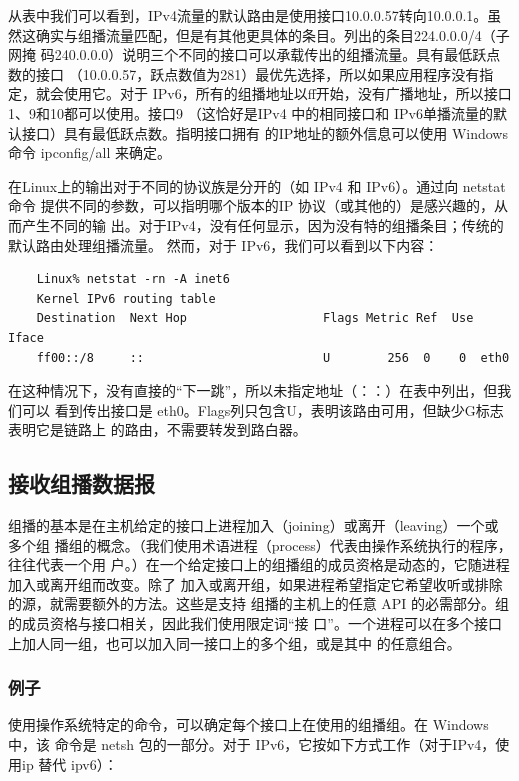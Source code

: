 从表中我们可以看到，IPv4流量的默认路由是使用接口10.0.0.57转向10.0.0.1。虽
然这确实与组播流量匹配，但是有其他更具体的条目。列出的条目224.0.0.0/4（子网掩
码240.0.0.0）说明三个不同的接口可以承载传出的组播流量。具有最低跃点数的接口
（10.0.0.57，跃点数值为281）最优先选择，所以如果应用程序没有指定，就会使用它。对于
IPv6，所有的组播地址以ff开始，没有广播地址，所以接口1、9和10都可以使用。接口9
（这恰好是IPv4 中的相同接口和 IPv6单播流量的默认接口）具有最低跃点数。指明接口拥有
的IP地址的额外信息可以使用 Windows 命令 ipconfig/all 来确定。

在Linux上的输出对于不同的协议族是分开的（如 IPv4 和 IPv6）。通过向 netstat 命令
提供不同的参数，可以指明哪个版本的IP 协议（或其他的）是感兴趣的，从而产生不同的输
出。对于IPv4，没有任何显示，因为没有特的组播条目；传统的默认路由处理组播流量。
然而，对于 IPv6，我们可以看到以下内容：

\begin{verbatim}
    Linux% netstat -rn -A inet6
    Kernel IPv6 routing table
    Destination  Next Hop                   Flags Metric Ref  Use Iface
    ff00::/8     ::                         U        256  0    0  eth0
\end{verbatim}

在这种情况下，没有直接的“下一跳”，所以未指定地址（：：）在表中列出，但我们可以
看到传出接口是 eth0。Flags列只包含U，表明该路由可用，但缺少G标志表明它是链路上
的路由，不需要转发到路白器。

\subsection{接收组播数据报}
组播的基本是在主机给定的接口上进程加入（joining）或离开（leaving）一个或多个组
播组的概念。（我们使用术语进程（process）代表由操作系统执行的程序，往往代表一个用
户。）在一个给定接口上的组播组的成员资格是动态的，它随进程加入或离开组而改变。除了
加入或离开组，如果进程希望指定它希望收听或排除的源，就需要额外的方法。这些是支持
组播的主机上的任意 API 的必需部分。组的成员资格与接口相关，因此我们使用限定词“接
口”。一个进程可以在多个接口上加人同一组，也可以加入同一接口上的多个组，或是其中
的任意组合。

\subsubsection{例子}

使用操作系统特定的命令，可以确定每个接口上在使用的组播组。在 Windows 中，该
命令是 netsh 包的一部分。对于 IPv6，它按如下方式工作（对于IPv4，使用ip 替代 ipv6）：

